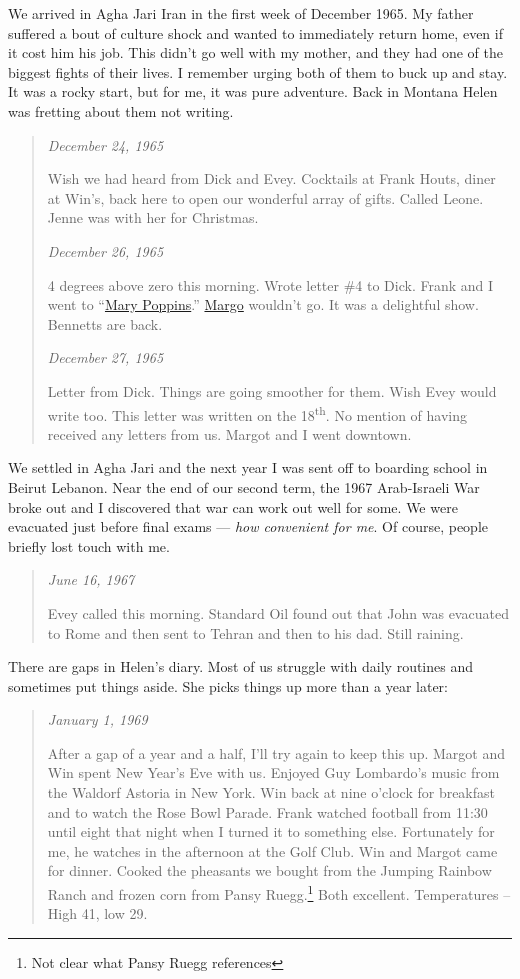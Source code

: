We arrived in Agha Jari Iran in the first week of December 1965. My
father suffered a bout of culture shock and wanted to immediately return
home, even if it cost him his job. This didn't go well with my mother,
and they had one of the biggest fights of their lives. I remember urging
both of them to buck up and stay. It was a rocky start, but for me, it
was pure adventure. Back in Montana Helen was fretting about them not
writing.

\begin{quote}
\emph{December 24, 1965}

Wish we had heard from Dick and Evey. Cocktails at Frank Houts, diner at
Win's, back here to open our wonderful array of gifts. Called Leone.
Jenne was with her for Christmas.

\emph{December 26, 1965}

4 degrees above zero this morning. Wrote letter \#4 to Dick. Frank and I
went to ``\href{https://en.wikipedia.org/wiki/Mary_Poppins_(film)}{Mary
Poppins}.'' \href{https://conceptcontrol.smugmug.com/People/Grandparents-1/i-dpTFf9d/A}{Margo} wouldn't go. It was a delightful show. Bennetts are
back.

\emph{December 27, 1965}

Letter from Dick. Things are going smoother for them. Wish Evey would
write too. This letter was written on the 18\textsuperscript{th}. No
mention of having received any letters from us. Margot and I went
downtown.
\end{quote}

We settled in Agha Jari and the next year I was sent off to boarding
school in Beirut Lebanon. Near the end of our second term, the 1967
Arab-Israeli War broke out and I discovered that war can work out well
for some. We were evacuated just before final exams --- \emph{how
convenient for me}. Of course, people briefly lost touch with me.

\begin{quote}
\emph{June 16, 1967}

Evey called this morning. Standard Oil found out that John was evacuated
to Rome and then sent to Tehran and then to his dad. Still raining.
\end{quote}

There are gaps in Helen's diary. Most of us struggle with daily routines
and sometimes put things aside. She picks things up more than a year
later:

\begin{quote}
\emph{January 1, 1969}

After a gap of a year and a half, I'll try again to keep this up. Margot
and Win spent New Year's Eve with us. Enjoyed Guy Lombardo's music from
the Waldorf Astoria in New York. Win back at nine o'clock for breakfast
and to watch the Rose Bowl Parade. Frank watched football from 11:30
until eight that night when I turned it to something else. Fortunately
for me, he watches in the afternoon at the Golf Club. Win and Margot
came for dinner. Cooked the pheasants we bought from the Jumping Rainbow
Ranch and frozen corn from Pansy
Ruegg.\footnote{Not clear what Pansy Ruegg references} Both excellent. Temperatures -- High 41, low 29.
\end{quote}

